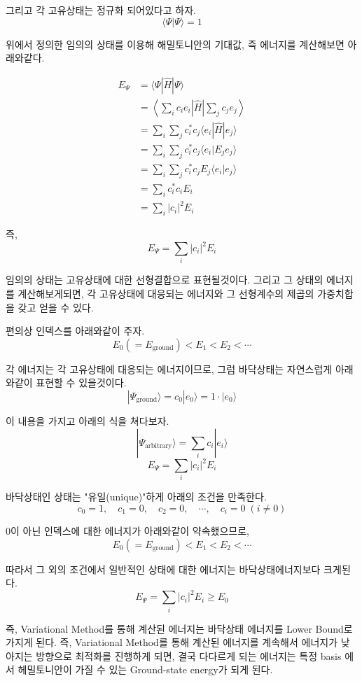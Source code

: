 \documentclass[10pt]{article}
\begin{document}
\begin{enumerate}[label=2)]
\begin{enumerate}[label=*]
\begin{mdframed}
그리고 각 고유상태는 정규화 되어있다고 하자.
\[
\langle \Psi | \Psi \rangle = 1
\]


위에서 정의한 임의의 상태를 이용해 해밀토니안의 기대값, 즉 에너지를 계산해보면 아래와같다.

\begin{align*}
E_\Psi &= \langle \Psi | \hat{H} | \Psi \rangle \\
&= \left\langle \sum_i c_i e_i \left| \hat{H} \right| \sum_j c_j e_j \right\rangle \\
&= \sum_{i} \sum_{j} c_i^* c_j \langle e_i | \hat{H} | e_j \rangle \\
&= \sum_{i} \sum_{j} c_i^* c_j \langle e_i | E_j e_j \rangle \\
&= \sum_{i} \sum_{j} c_i^* c_j E_j \langle e_i | e_j \rangle \\
&= \sum_{i} c_i^* c_i E_i \\
&= \sum_{i} |c_i|^2 E_i \tag{2}
\end{align*}

즉,
\[
E_\Psi = \sum_{i} |c_i|^2 E_i
\]

임의의 상태는 고유상태에 대한 선형결합으로 표현될것이다. 그리고 그 상태의 에너지를 계산해보게되면, 각 고유상태에 대응되는 에너지와 그 선형계수의 제곱의 가중치합을 갖고 얻을 수 있다.

편의상 인덱스를 아래와같이 주자.
\[
E_0 (= E_{\text{ground}}) < E_1 < E_2 < \cdots
\]

각 에너지는 각 고유상태에 대응되는 에너지이므로, 그럼 바닥상태는 자연스럽게 아래와같이 표현할 수 있을것이다.
\[
|\Psi_{\text{ground}}\rangle = c_0 | e_0 \rangle = 1 \cdot | e_0 \rangle
\]

이 내용을 가지고 아래의 식을 쳐다보자.
\[
|\Psi_{\text{arbitrary}}\rangle = \sum_i c_i | e_i \rangle
\]
\[
E_\Psi = \sum_{i} |c_i|^2 E_i
\]

바닥상태인 상태는 "유일(unique)"하게 아래의 조건을 만족한다.
\[
c_0=1, \quad c_1=0, \quad c_2=0, \quad \cdots, \quad c_i=0 \; (i \neq 0)
\]

0이 아닌 인덱스에 대한 에너지가 아래와같이 약속했으므로,
\[
E_0 (= E_{\text{ground}}) < E_1 < E_2 < \cdots
\]

따라서 그 외의 조건에서 일반적인 상태에 대한 에너지는 바닥상태에너지보다 크게된다.
\[
E_\Psi = \sum_i |c_i|^2 E_i \ge E_0
\]
\end{mdframed}
즉, Variational Method를 통해 계산된 에너지는 바닥상태 에너지를 Lower Bound로 가지게 된다. 
즉, Variational Method를 통해 계산된 에너지를 계속해서 에너지가 낮아지는 방향으로 최적화를 진행하게 되면, 결국 다다르게 되는 에너지는 특정 basis 에서 헤밀토니안이 가질 수 있는 Ground-state energy가 되게 된다. 


\end{enumerate}
\end{enumerate}
\end{document}
